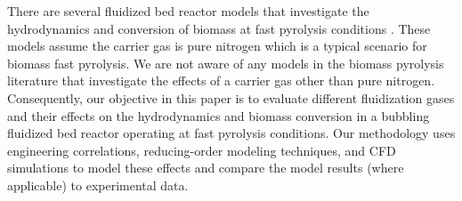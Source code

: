 There are several fluidized bed reactor models that investigate the hydrodynamics and conversion of biomass at fast pyrolysis conditions \cite{Papadikis-2009, Papadikis-2010, Mellin-2014, Xiong-2016, Xue-2011}. These models assume the carrier gas is pure nitrogen which is a typical scenario for biomass fast pyrolysis. We are not aware of any models in the biomass pyrolysis literature that investigate the effects of a carrier gas other than pure nitrogen. Consequently, our objective in this paper is to evaluate different fluidization gases and their effects on the hydrodynamics and biomass conversion in a bubbling fluidized bed reactor operating at fast pyrolysis conditions. Our methodology uses engineering correlations, reducing-order modeling techniques, and CFD simulations to model these effects and compare the model results (where applicable) to experimental data.
